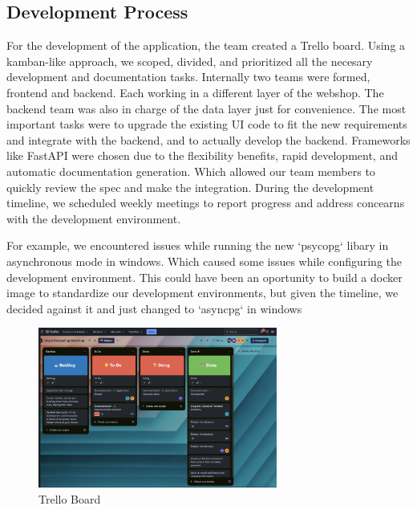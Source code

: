\documentclass{llncs}
\begin{document}
\subsection{Development Process}

For the development of the application, the team created a Trello board. Using a kamban-like approach, we scoped, 
divided, and prioritized all the necesary development and documentation tasks. Internally two teams were formed, frontend and backend.
Each working in a different layer of the webshop. The backend team was also in charge of the data layer just for convenience. 
The most important tasks were to upgrade the existing UI code to fit the new requirements and integrate with the backend, and to actually develop the backend.
Frameworks like FastAPI were chosen due to the flexibility benefits, rapid development, and automatic documentation generation. Which allowed our team members to quickly review the spec and make the integration.
During the development timeline, we scheduled weekly meetings to report progress and address concearns with the development environment.

For example, we encountered issues while running the new `psycopg` libary in asynchronous mode in windows. Which caused some issues while configuring the development environment.
This could have been an oportunity to build a docker image to standardize our development environments, but given the timeline, we decided against it and just changed to `asyncpg` in windows \\
\begin{figure}[htbp]
    \begin{center}
        \includegraphics[width=0.7\textwidth]{../diagrams/trello_board.png}
        \vspace{0.01\textwidth}
        \caption{Trello Board}
        \label{TrelloBoard} %
    \end{center}
\end{figure}
\end{document}
